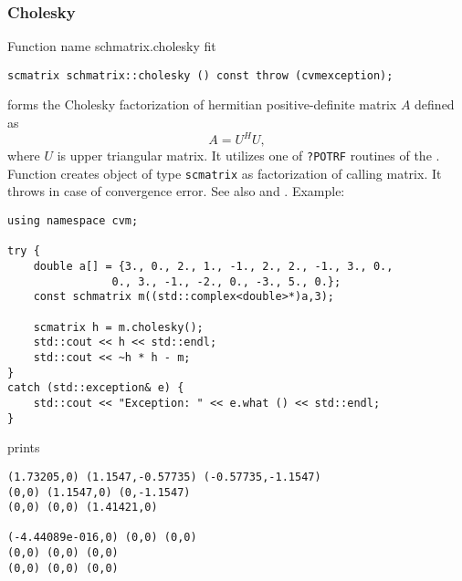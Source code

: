 \subsubsection{Cholesky}
Function%
\pdfdest name {schmatrix.cholesky} fit
\begin{verbatim}
scmatrix schmatrix::cholesky () const throw (cvmexception);
\end{verbatim}
forms the Cholesky factorization of  hermitian positive-definite 
matrix $A$ defined as
\begin{equation*}
A=U^H U,
\end{equation*}
where $U$ is upper triangular matrix.
It utilizes one of \verb"?POTRF" routines of the
.
Function
creates  object of type \verb"scmatrix" as 
 factorization of  calling matrix.
It throws  
in case of convergence error.
See also
 and
.
Example:
\begin{Verbatim}
using namespace cvm;

try {
    double a[] = {3., 0., 2., 1., -1., 2., 2., -1., 3., 0.,
                0., 3., -1., -2., 0., -3., 5., 0.};
    const schmatrix m((std::complex<double>*)a,3);
    
    scmatrix h = m.cholesky();
    std::cout << h << std::endl;
    std::cout << ~h * h - m;
}
catch (std::exception& e) {
    std::cout << "Exception: " << e.what () << std::endl;
}
\end{Verbatim}
prints
\begin{Verbatim}
(1.73205,0) (1.1547,-0.57735) (-0.57735,-1.1547)
(0,0) (1.1547,0) (0,-1.1547)
(0,0) (0,0) (1.41421,0)

(-4.44089e-016,0) (0,0) (0,0)
(0,0) (0,0) (0,0)
(0,0) (0,0) (0,0)
\end{Verbatim}
\newpage



